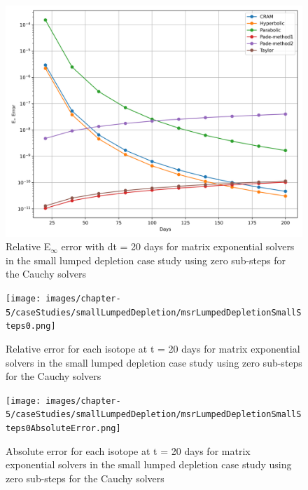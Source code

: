 \clearpage

\begin{figure}[p]
    \centering
    \includegraphics[width=5in]{images/chapter-5/caseStudies/smallLumpedDepletion/msrSmallLumpDepletionEinfErrorerrorSteps0.png}
    \caption{Relative E$_{\infty}$ error with dt = 20 days for matrix exponential solvers in the small lumped depletion case study using zero sub-steps for the Cauchy solvers}
    \label{fig:small_lumped_depletion_Einf_steps0}
\end{figure}

\clearpage

\begin{landscape}
\thispagestyle{mylandscape}
\begin{figure}[p]
    \centering
    \texttt{[image: images/chapter-5/caseStudies/smallLumpedDepletion/msrLumpedDepletionSmallSteps0.png]}
    \caption{Relative error for each isotope at t = 20 days for matrix exponential solvers in the small lumped depletion case study using zero sub-steps for the Cauchy solvers}
    \label{fig:small_lumped_depletion_species_relative_errors}
\end{figure}
\end{landscape}

\clearpage

\begin{landscape}
\thispagestyle{mylandscape}
\begin{figure}[p]
    \centering
    \texttt{[image: images/chapter-5/caseStudies/smallLumpedDepletion/msrLumpedDepletionSmallSteps0AbsoluteError.png]}
    \caption{Absolute error for each isotope at t = 20 days for matrix exponential solvers in the small lumped depletion case study using zero sub-steps for the Cauchy solvers}
    \label{fig:small_lumped_depletion_species_absolute_errors}
\end{figure}
\end{landscape}

